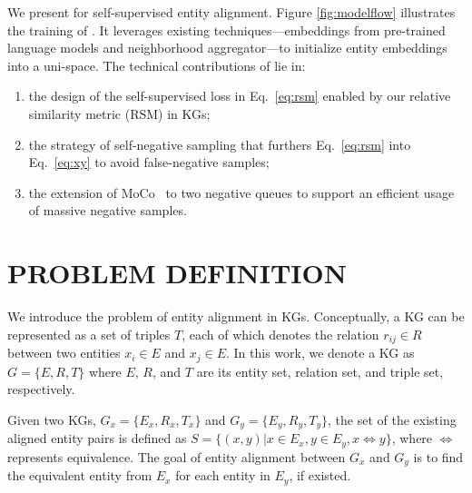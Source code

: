 We present \solution for self-supervised entity alignment.
Figure \ref{fig:modelflow} illustrates the training of \solution. 
It leverages existing techniques---embeddings from pre-trained language models and neighborhood aggregator---to initialize entity embeddings into a uni-space.  
The technical contributions of \solution lie in:
\begin{enumerate}
    \item  the design of the self-supervised loss in Eq.~\ref{eq:rsm} enabled by our relative similarity metric (RSM) in KGs; 
    \item  the strategy of self-negative sampling that furthers Eq.~\ref{eq:rsm} into Eq.~\ref{eq:xy} to avoid false-negative samples; 
    \item the extension of MoCo~\cite{he2020momentum} to two negative queues to support an efficient usage of massive negative samples. 
\end{enumerate}









\section{PROBLEM DEFINITION}
We introduce the problem of entity alignment in KGs. 
Conceptually, a KG can be represented as a set of triples $T$, each of which denotes the relation $r_{ij}\in R$ between two entities $x_i\in E$ and $x_j\in E$. 
In this work, we denote a KG as $G=\{E,R,T\}$ where $E$, $R$, and $T$ are its entity set, relation set, and triple set, respectively. 


Given two KGs, $G_x = \{E_x,R_x,T_x\}$ and $G_y = \{E_y,R_y,T_y\}$, the set of the existing aligned entity pairs is defined as $S = \{(x,y)|x\in E_x, y \in E_y, x\Leftrightarrow y\}$, where $\Leftrightarrow$ represents equivalence. 
The goal of entity alignment between $G_x$ and $G_y$ is to find the equivalent entity from $E_x$ for each entity in $E_y$, if existed.

